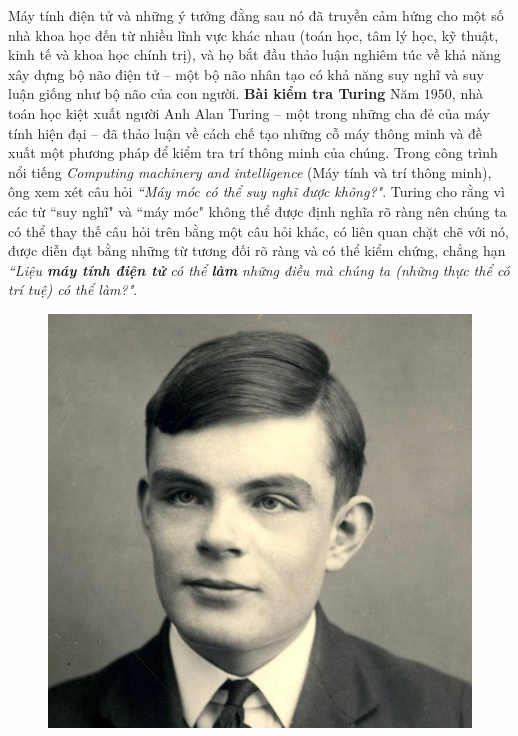 \begin{multicols}{2}
	\vskip 0.1cm
	Máy tính điện tử và những ý tưởng đằng sau nó đã truyền cảm hứng cho một số nhà khoa học đến từ nhiều lĩnh vực khác nhau (toán học, tâm lý học, kỹ thuật, kinh tế và khoa học chính trị), và họ bắt đầu thảo luận nghiêm túc về khả năng xây dựng  bộ não điện tử -- một bộ não nhân tạo có khả năng suy nghĩ và suy luận giống như bộ não của con người.
	\vskip 0.1cm
	\textbf{\color{timhieukhoahoc}Bài kiểm tra Turing}
	\vskip 0.1cm
	Năm $1950$, nhà toán học kiệt xuất người Anh Alan Turing -- một trong những cha đẻ của máy tính hiện đại -- đã thảo luận về cách chế tạo những cỗ máy thông minh và đề xuất một phương pháp để kiểm tra trí thông minh của chúng. Trong công trình nổi tiếng \textit{Computing machinery and
		intelligence} (Máy tính và trí thông minh), ông xem xét câu hỏi \textit{``Máy móc có thể suy nghĩ được không?"}. Turing cho rằng vì các từ ``suy nghĩ" và ``máy móc" không thể được định nghĩa rõ ràng nên chúng ta có thể thay thế câu hỏi trên bằng một câu hỏi khác, có liên quan chặt chẽ với nó, được diễn đạt bằng những từ tương đối rõ ràng và có thể kiểm chứng, chẳng hạn \textit{``Liệu \textbf{\color{timhieukhoahoc}máy tính điện tử} có thể \textbf{\color{timhieukhoahoc}làm} những điều mà chúng ta (những thực thể có trí tuệ) có thể làm?"}.
	\begin{figure}[H]
		\vspace*{-5pt}
		\centering
		\captionsetup{labelformat= empty, justification=centering}
		\includegraphics[width= 1\linewidth]{Alan-Turing.jpg}

\end{figure}
\end{multicols}
